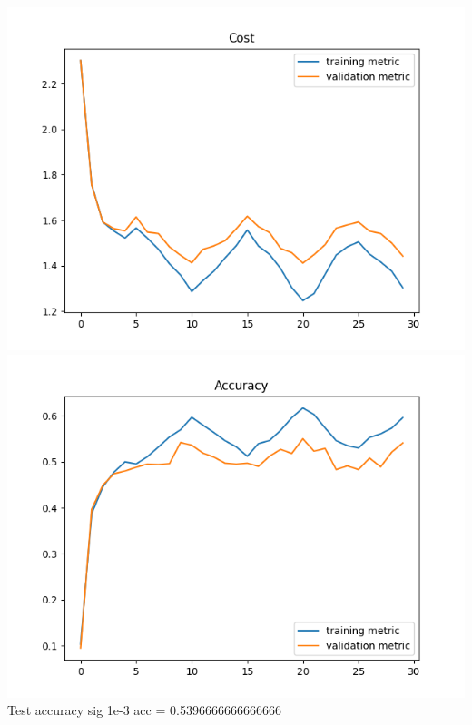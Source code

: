 \documentclass[11pt,a4paper]{article}
\begin{document}
\includegraphics[width=\textwidth]{batch_norm_sig=1e-3_cost-.png}
\includegraphics[width=\textwidth]{batch_norm_sig=1e-3_accuracy-.png}
Test accuracy sig 1e-3 acc = 0.5396666666666666\\
\end{document}
